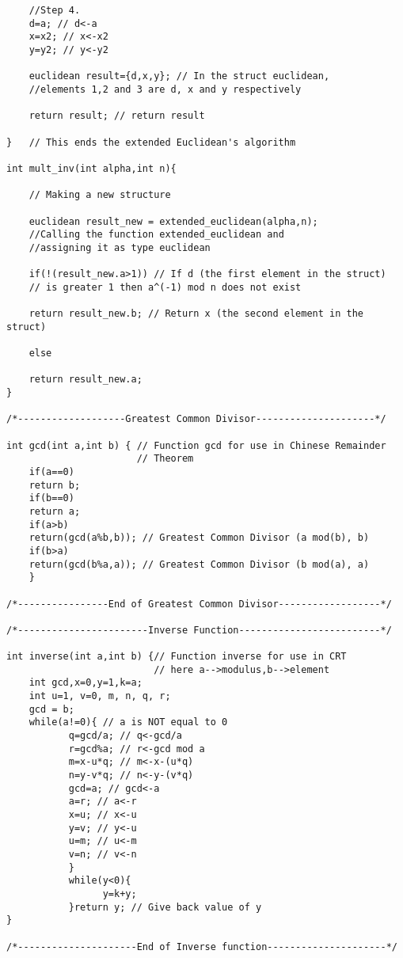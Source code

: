 \documentclass[iwp,first]{luthesis}
\begin{document}
\begin{verbatim}
    //Step 4.
    d=a; // d<-a
    x=x2; // x<-x2
    y=y2; // y<-y2
    
    euclidean result={d,x,y}; // In the struct euclidean, 
    //elements 1,2 and 3 are d, x and y respectively
    
    return result; // return result
    
}   // This ends the extended Euclidean's algorithm

int mult_inv(int alpha,int n){
        
    // Making a new structure

    euclidean result_new = extended_euclidean(alpha,n); 
    //Calling the function extended_euclidean and 
    //assigning it as type euclidean 
    
    if(!(result_new.a>1)) // If d (the first element in the struct) 
    // is greater 1 then a^(-1) mod n does not exist 

    return result_new.b; // Return x (the second element in the struct)
    
    else 
    
    return result_new.a; 
}

/*-------------------Greatest Common Divisor---------------------*/

int gcd(int a,int b) { // Function gcd for use in Chinese Remainder 
                       // Theorem
    if(a==0)
    return b;
    if(b==0)
    return a;
    if(a>b)
    return(gcd(a%b,b)); // Greatest Common Divisor (a mod(b), b)
    if(b>a)
    return(gcd(b%a,a)); // Greatest Common Divisor (b mod(a), a)
    }
    
/*----------------End of Greatest Common Divisor------------------*/

/*-----------------------Inverse Function-------------------------*/    
    
int inverse(int a,int b) {// Function inverse for use in CRT
                          // here a-->modulus,b-->element 
    int gcd,x=0,y=1,k=a;
    int u=1, v=0, m, n, q, r;
    gcd = b;
    while(a!=0){ // a is NOT equal to 0
           q=gcd/a; // q<-gcd/a
           r=gcd%a; // r<-gcd mod a
           m=x-u*q; // m<-x-(u*q)
           n=y-v*q; // n<-y-(v*q)
           gcd=a; // gcd<-a
           a=r; // a<-r
           x=u; // x<-u
           y=v; // y<-u
           u=m; // u<-m
           v=n; // v<-n
           }
           while(y<0){
                 y=k+y;
           }return y; // Give back value of y
}

/*---------------------End of Inverse function---------------------*/


\end{verbatim}
\end{document}
